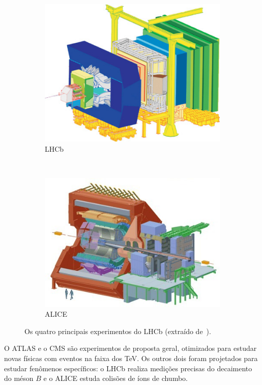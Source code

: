 \begin{figure}[h!]
\begin{subfigure}[b]{0.45\textwidth}
        \includegraphics[width=\textwidth]{images/lhcb.jpg}
        \caption{LHCb}
    \end{subfigure}
    ~
    \begin{subfigure}[b]{0.45\textwidth}
        \centering
        \includegraphics[width=\textwidth]{images/alice.jpg}
        \caption{ ALICE}
    \end{subfigure}
    \caption[Os quatro principais experimentos do LHCb]{Os quatro principais
    experimentos do LHCb (extraído de~\cite{ref:solans}).}
    \label{fig:experiments}
\end{figure}

O ATLAS e o CMS são experimentos de proposta geral, otimizados para estudar
novas físicas com eventos na faixa dos TeV. Os outros dois foram projetados para
estudar fenômenos específicos: o LHCb realiza medições precisas do decaimento do
méson $B$ e o ALICE estuda colisões de íons de chumbo.


